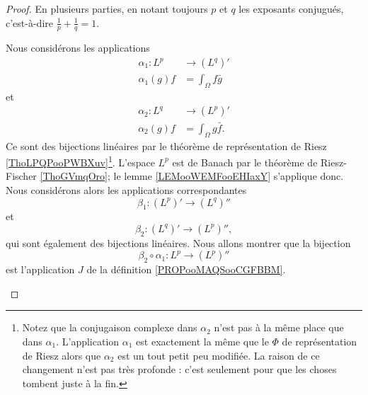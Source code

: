 \begin{proof}
En plusieurs parties, en notant toujours \( p\) et \( q\) les exposants conjugués, c'est-à-dire \( \frac{1}{ p }+\frac{1}{ q }=1\).
\begin{subproof}

    Nous considérons les applications
    \begin{equation}
        \begin{aligned}
            \alpha_1\colon L^p & \to (L^q)'            \\
            \alpha_1(g)f       & =\int_{\Omega}f\bar g
        \end{aligned}
    \end{equation}
    et
    \begin{equation}
        \begin{aligned}
            \alpha_2\colon L^q & \to (L^p)'             \\
            \alpha_2(g)f       & =\int_{\Omega}g\bar f.
        \end{aligned}
    \end{equation}
    Ce sont des bijections linéaires par le théorème de représentation de Riesz \ref{ThoLPQPooPWBXuv}\footnote{Notez que la conjugaison complexe dans \( \alpha_2\) n'est pas à la même place que dans \( \alpha_1\). L'application \( \alpha_1\) est exactement la même que le \( \Phi\) de représentation de Riesz alors que \( \alpha_2\) est un tout petit peu modifiée. La raison de ce changement n'est pas très profonde : c'est seulement pour que les choses tombent juste à la fin.}. L'espace  \( L^p\) est de Banach par le théorème de Riesz-Fischer \ref{ThoGVmqOro}; le lemme \ref{LEMooWEMFooEHIaxY} s'applique donc. Nous considérons alors les applications correspondantes
    \begin{equation}
        \beta_1\colon (L^p)'\to (L^q)''
    \end{equation}
    et
    \begin{equation}
        \beta_2\colon (L^q)'\to (L^p)'',
    \end{equation}
    qui sont également des bijections linéaires. Nous allons montrer que la bijection
    \begin{equation}
        \beta_2\circ \alpha_1\colon L^p\to (L^p)''
    \end{equation}
    est l'application \( J\) de la définition \ref{PROPooMAQSooCGFBBM}.


\end{subproof}
\end{proof}

